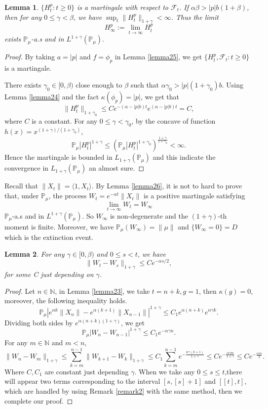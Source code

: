 \documentclass{article}
\newtheorem{lemma}{Lemma}[section]
\begin{document}
\begin{lemma}\label{lemma26}
$\{H_t^p: t\geq0\}$ is a martingale with respect to $\mathcal{F}_t$. If $\alpha\beta>|p|b(1+\beta)$, then for any $0\leq \gamma<\beta$, we have $\sup_t\|H_t^p\|_{1+\gamma}< \infty$. Thus the limit
$$H_{\infty}^p:=\lim_{t\rightarrow \infty}H_t^p$$
exists $\mathbb{P}_{\mu}$-a.s and in $L^{1+\gamma}(\mathbb{P}_{\mu}).$
\end{lemma}
\begin{proof}
    By taking $a=|p|$ and $f=\phi_p$ in Lemma \ref{lemma25}, we get $\{H_t^p, \mathcal{F}_t:t\geq 0\}$ is a martingale.

    There exists $\gamma_0 \in [0,\beta)$ close enough to $\beta$ such that $\alpha\gamma_0>|p|(1+\gamma_0)b$. Using  Lemma \eqref{lemma24} and the fact $\kappa(\phi_p)=|p|$, we get that
    $$\|H_t^p\|_{1+\gamma_0}\leq Ce^{-(\alpha-|p|b)t}e^{(\alpha-|p|b)t}=C,$$
    where $C$ is a constant. For any $0\leq\gamma<\gamma_0$, by the concave of function $h(x)=x^{(1+\gamma)/(1+\gamma_0)}$, 
    $$\mathbb{P}_{\mu}|H_t^p|^{1+\gamma}\leq(\mathbb{P}_{\mu}|H_t^p|^{1+\gamma_0})^{\frac{1+\gamma}{1+\gamma_0}}<\infty.$$
    Hence the martingale is bounded in $L_{1+\gamma}(\mathbb{P}_{\mu})$ and this indicate the convergence in $L_{1+\gamma}(\mathbb{P}_{\mu}) $ an almost sure.
\end{proof}


Recall that $\|X_t\|=\langle 1,X_t\rangle$. By Lemma \eqref{lemma26}, it is not to hard to prove that, under $\mathbb{P}_{\mu}$, the process $W_t=e^{-\alpha t}\|X_t\|$ is a positive martingale satisfying
$$\lim_{t\rightarrow \infty} W_t= W_{\infty}$$
$\mathbb{P}_{\mu}$-a.s and in $L^{1+\gamma}(\mathbb{P}_{\mu})$. So $W_{\infty}$ is non-degenerate and the $(1+\gamma)$-th moment is finite. Moreover, we have $\mathbb{P}_{\mu}(W_{\infty})=\|\mu\|$ and $\{W_{\infty}=0\}=D$ which is the extinction event.
\begin{lemma}\label{lemma27}
 For any $\gamma\in [0,\beta)$ and $0\leq s<t$, we have 
 $$\|W_t-W_s\|_{1+\gamma}\leq C e^{-\alpha s/2},$$
 for some C just depending on $\gamma$.
\end{lemma}

\begin{proof}
    Let $n\in \mathbb{N}$, in Lemma \eqref{lemma23}, we take $t=n+k,g=1$, then $\kappa(g)=0$, moreover, the following inequality holds.
    $$ \mathbb{P}_{\mu}\left|e^{\alpha k}\|X_n\|-e^{\alpha(k+1)}\|X_{n-1}\|\right|^{1+\gamma}\leq C_1 e^{\alpha(n+k)}e^{\alpha\gamma k}.$$
    Dividing both sides by $e^{\alpha(n+k)(1+\gamma)}$, we get
    $$\mathbb{P}_{\mu}\left|W_n-W_{n-1}\right|^{1+\gamma}\leq C_1 e^{-\alpha \gamma n}.$$
    For any $m\in \mathbb{N}$ and $m<n$, 
    $$\|W_n-W_m\|_{1+\gamma}\leq \sum_{k=m}^{n-1}\|W_{k+1}-W_k\|_{1+\gamma}\leq C_1\sum_{k=m}^{n-1}e^{-\frac{\alpha\gamma(k+1)}{1+\gamma}}\leq C e^{-\frac{\alpha\gamma m}{1+\gamma}}\leq C e^{-\frac{\alpha m}{2}}.$$
    Where $C,C_1$ are constant just depending $\gamma$.
 When we take any $0\leq s\leq t$,there will appear two terms corresponding to the interval $[s,[s]+1]$ and $[[t],t]$, which are  handled by using Remark \ref{remark2} with the same method, then we complete our proof.
\end{proof}
\end{document}
